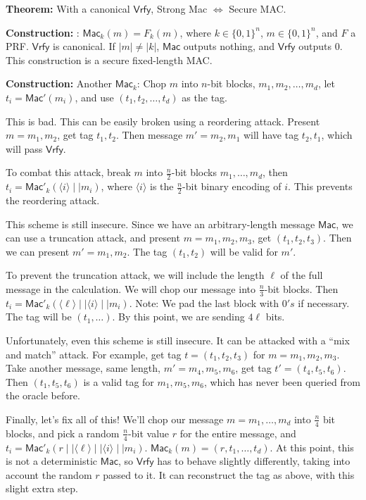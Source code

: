 \documentclass[10pt]{article}
\newcommand{\thm}[1]{{\bf Theorem:} \underline{#1}}
\newcommand{\con}[1]{{\bf Construction:} \underline{#1}}
\newcommand{\Mac}{\mathsf{Mac}}
\newcommand{\Vrfy}{\mathsf{Vrfy}}
\newcommand{\ang}[1]{\langle#1\rangle}
\begin{document}
\begin{multicols}{4}
\thm{} With a canonical $\Vrfy$, Strong Mac $\Leftrightarrow$ Secure MAC.

\con{}: $\Mac_k(m)=F_k(m)$, where $k\in\{0,1\}^n$, $m\in\{0,1\}^n$, and $F$ a PRF. $\Vrfy$ is canonical. If $|m|\neq|k|$, $\Mac$ outputs nothing, and $\Vrfy$ outputs $0$. This construction is a secure fixed-length MAC.

\con{} Another $\Mac_k$: Chop $m$ into $n$-bit blocks, $m_1,m_2,\dots,m_d$, let $t_i=\Mac'(m_i)$, and use $(t_1,t_2,\dots,t_d)$ as the tag.

This is bad. This can be easily broken using a reordering attack. Present $m=m_1,m_2$, get tag $t_1,t_2$. Then message $m'=m_2,m_1$ will have tag $t_2,t_1$, which will pass $\Vrfy$.

To combat this attack, break $m$ into $\frac{n}{2}$-bit blocks $m_1,\dots,m_d$, then $t_i=\Mac'_k(\ang{i}\mid\mid m_i)$, where $\ang{i}$ is the $\frac{n}{2}$-bit binary encoding of $i$. This prevents the reordering attack.

This scheme is still insecure. Since we have an arbitrary-length message $\Mac$, we can use a truncation attack, and present $m=m_1,m_2,m_3$, get $(t_1,t_2,t_3)$. Then we can present $m'=m_1,m_2$. The tag $(t_1,t_2)$ will be valid for $m'$.

To prevent the truncation attack, we will include the length $\ell$ of the full message in the calculation. We will chop our message into $\frac{n}{3}$-bit blocks. Then $t_i=\Mac'_k(\ang{\ell}\mid\mid\ang{i}\mid\mid m_i)$. Note: We pad the last block with $0's$ if necessary. The tag will be $(t_1,\dots)$. By this point, we are sending $4\ell$ bits.

Unfortunately, even this scheme is still insecure. It can be attacked with a ``mix and match'' attack. For example, get tag $t=(t_1,t_2,t_3)$ for $m=m_1,m_2,m_3$. Take another message, same length, $m'=m_4,m_5,m_6$, get tag $t'=(t_4,t_5,t_6)$. Then $(t_1,t_5,t_6)$ is a valid tag for $m_1,m_5,m_6$, which has never been queried from the oracle before.

Finally, let's fix all of this! We'll chop our message $m=m_1,\dots,m_d$ into $\frac{n}{4}$ bit blocks, and pick a random $\frac{n}{4}$-bit value $r$ for the entire message, and $t_i=\Mac'_k(r\mid\mid\ang{\ell}\mid\mid\ang{i}\mid\mid m_i)$. $\Mac_k(m)=(r,t_1,\dots,t_d)$. At this point, this is not a deterministic $\Mac$, so $\Vrfy$ has to behave slightly differently, taking into account the random $r$ passed to it. It can reconstruct the tag as above, with this slight extra step.


\end{multicols}
\end{document}
